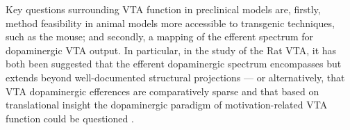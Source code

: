 

Key questions surrounding VTA function in preclinical models are, firstly, method feasibility in animal models more accessible to transgenic techniques, such as the mouse; and secondly, a mapping of the efferent spectrum for dopaminergic VTA output.
In particular, in the study of the Rat VTA, it has both been suggested that the efferent dopaminergic spectrum encompasses but extends beyond well-documented structural projections \cite{Lohani2016} --- or alternatively, that VTA dopaminergic efferences are comparatively sparse and that based on translational insight the dopaminergic paradigm of motivation-related VTA function could be questioned \cite{Brocka2018}.

